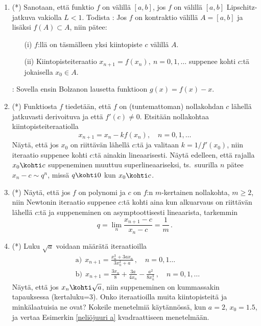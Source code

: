 \begin{enumerate}
\item (*) \label{H-V-7: kontraktiokuvauslause} 
Sanotaan, että funktio $f$ on  välillä $[a,b]$, jos $f$ on välillä $[a,b]$
Lipschitz-jatkuva vakiolla $L<1$. Todista : Jos $f$ on kontraktio
välillä $A=[a,b]$ ja lisäksi $f(A) \subset A$, niin pätee:
\begin{itemize}
\item[(i)]  $f$:llä on täsmälleen yksi kiintopiste $c$ välillä $A$.
\item[(ii)] Kiintopisteiteraatio $x_{n+1}=f(x_n),\ n=0,1,\ldots$ suppenee kohti $c$:tä
            jokaisella $x_0 \in A$.
\end{itemize}
: Sovella ensin Bolzanon lausetta funktioon $g(x)=f(x)-x$.

\item (*) \label{H-V-7: yksinkertaistettu Newton}
Funktiosta $f$ tiedetään, että $f$ on (tuntemattoman) nollakohdan $c$ lähellä jatkuvasti
derivoituva ja että $f'(c) \neq 0$. Etsitään nollakohtaa kiintopisteiteraatiolla
\[
x_{n+1}=x_n-kf(x_n), \quad n=0,1,\ldots
\]
Näytä, että jos $x_0$ on riittävän lähellä $c$:tä ja valitaan $k=1/f'(x_0)$, niin iteraatio
suppenee kohti $c$:tä ainakin lineaarisesti. Näytä edelleen, että rajalla $x_0 \kohti c$
suppeneminen muuttuu superlineaariseksi, ts.\ suurilla $n$ pätee $x_n-c \sim q^n$, missä
$q \kohti 0$ kun $x_0 \kohti c$.

\item (*) \label{H-V-7: moninkertainen nollakohta ja Newton}
Näytä, että jos $f$ on polynomi ja $c$ on $f$:n $m$-kertainen nollakohta, $m \ge 2$, niin
Newtonin iteraatio suppenee $c$:tä kohti aina kun alkuarvaus on riittävän lähellä $c$:tä 
ja suppeneminen on asymptoottisesti lineaarista, tarkemmin 
\[
q = \lim_n \frac{x_{n+1}-c}{x_n-c} = \frac{1}{m}\,.
\] 

\item (*) \label{H-V-7: kuutiollisia iteraatioita} 
Luku $\sqrt{a}$ voidaan määrätä iteraatioilla
\begin{align*}
&\text{a)}\ \ x_{n+1}=\frac{x_n^3+3ax_n}{3x_n^2+a}\,, \quad n=0,1\ldots \\
&\text{b)}\ \ x_{n+1}=\frac{3x_n}{8}+\frac{3a}{4x_n}-\frac{a^2}{8x_n^3}\,, \quad n=0,1,\ldots
\end{align*}
Näytä, että jos $x_n\kohti\sqrt{a}$, niin suppeneminen on kummassakin tapauksessa
 (kertaluku=3). Onko iteraatioilla muita kiintopisteitä ja minkälaatuisia ne
ovat? Kokeile menetelmiä käytännössä, kun $a=2$, $x_0=1.5$, ja vertaa Esimerkin
\ref{neliöjuuri a} kvadraattiseen menetelmään.


\end{enumerate}
